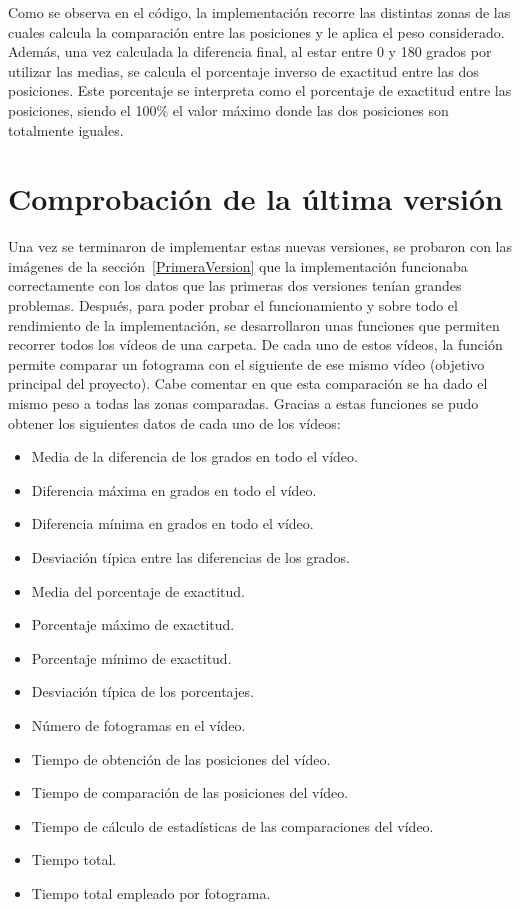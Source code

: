 {Como se observa en el código, la implementación recorre las distintas zonas de las cuales calcula la comparación entre las posiciones y le aplica el peso considerado. Además, una vez calculada la diferencia final, al estar entre 0 y 180 grados por utilizar las medias, se calcula el porcentaje inverso de exactitud entre las dos posiciones. Este porcentaje se interpreta como el porcentaje de exactitud entre las posiciones, siendo el 100\% el valor máximo donde las dos posiciones son totalmente iguales.

\section{Comprobación de la última versión}
Una vez se terminaron de implementar estas nuevas versiones, se probaron con las imágenes de la sección~\ref{PrimeraVersion} que la implementación funcionaba correctamente con los datos que las primeras dos versiones tenían grandes problemas. Después, para poder probar el funcionamiento y sobre todo el rendimiento de la implementación, se desarrollaron unas funciones que permiten recorrer todos los vídeos de una carpeta. De cada uno de estos vídeos, la función permite comparar un fotograma con el siguiente de ese mismo vídeo (objetivo principal del proyecto). Cabe comentar en que esta comparación se ha dado el mismo peso a todas las zonas comparadas. Gracias a estas funciones se pudo obtener los siguientes datos de cada uno de los vídeos:
\begin{itemize}
	\item Media de la diferencia de los grados en todo el vídeo.
	\item Diferencia máxima en grados en todo el vídeo.
	\item Diferencia mínima en grados en todo el vídeo.
	\item Desviación típica entre las diferencias de los grados.
	\item Media del porcentaje de exactitud.
	\item Porcentaje máximo de exactitud.
	\item Porcentaje mínimo de exactitud.
	\item Desviación típica de los porcentajes.
	\item Número de fotogramas en el vídeo.
	\item Tiempo de obtención de las posiciones del vídeo.
	\item Tiempo de comparación de las posiciones del vídeo.
	\item Tiempo de cálculo de estadísticas de las comparaciones del vídeo.
	\item Tiempo total.
	\item Tiempo total empleado por fotograma.
\end{itemize}

}
